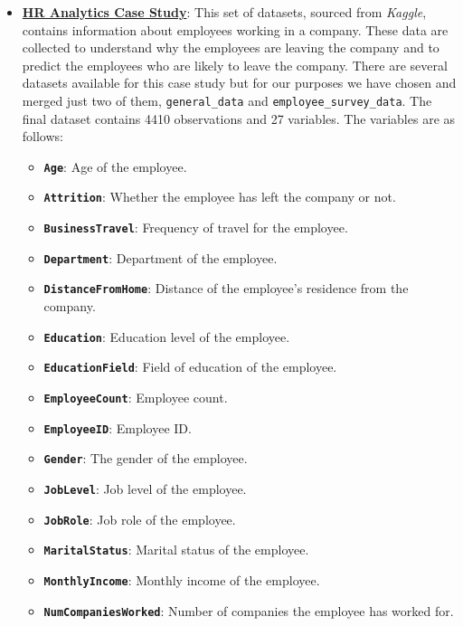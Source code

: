 \documentclass[
]{article}
\providecommand{\tightlist}{%
  \setlength{\itemsep}{0pt}\setlength{\parskip}{0pt}}
\begin{document}
\begin{itemize}
\item
  \href{https://www.kaggle.com/datasets/vjchoudhary7/hr-analytics-case-study}{\textbf{HR
  Analytics Case Study}}: This set of datasets, sourced from
  \emph{Kaggle}, contains information about employees working in a
  company. These data are collected to understand why the employees are
  leaving the company and to predict the employees who are likely to
  leave the company. There are several datasets available for this case
  study but for our purposes we have chosen and merged just two of them,
  \texttt{general\_data} and \texttt{employee\_survey\_data}. The final
  dataset contains 4410 observations and 27 variables. The variables are
  as follows:

  \begin{itemize}
  \tightlist
  \item
    \textbf{\texttt{Age}}: Age of the employee.
  \item
    \textbf{\texttt{Attrition}}: Whether the employee has left the
    company or not.
  \item
    \textbf{\texttt{BusinessTravel}}: Frequency of travel for the
    employee.
  \item
    \textbf{\texttt{Department}}: Department of the employee.
  \item
    \textbf{\texttt{DistanceFromHome}}: Distance of the employee's
    residence from the company.
  \item
    \textbf{\texttt{Education}}: Education level of the employee.
  \item
    \textbf{\texttt{EducationField}}: Field of education of the
    employee.
  \item
    \textbf{\texttt{EmployeeCount}}: Employee count.
  \item
    \textbf{\texttt{EmployeeID}}: Employee ID.
  \item
    \textbf{\texttt{Gender}}: The gender of the employee.
  \item
    \textbf{\texttt{JobLevel}}: Job level of the employee.
  \item
    \textbf{\texttt{JobRole}}: Job role of the employee.
  \item
    \textbf{\texttt{MaritalStatus}}: Marital status of the employee.
  \item
    \textbf{\texttt{MonthlyIncome}}: Monthly income of the employee.
  \item
    \textbf{\texttt{NumCompaniesWorked}}: Number of companies the
    employee has worked for.

\end{itemize}
\end{itemize}
\end{document}
